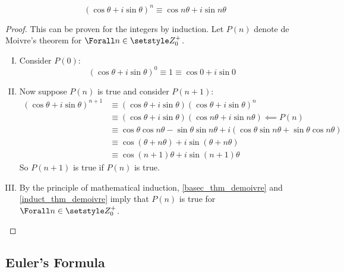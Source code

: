 \begin{theorem}
 \begin{equation*}
  (\cos \theta + i \sin \theta)^n \equiv \cos n\theta + i \sin n\theta
 \end{equation*}
\end{theorem}
\begin{proof}
 This can be proven for the integers by induction. Let \(P(n)\) denote de
 Moivre's theorem for \(\Forall n \in \Integers_0^+\).
 \begin{enumerate}[I.]
  \item \label{basec_thm_demoivre} Consider \(P(0)\):
        \begin{equation*}
         (\cos \theta + i \sin \theta)^0 \equiv 1 \equiv \cos 0 + i \sin 0
        \end{equation*}
  \item \label{induct_thm_demoivre} Now suppose \(P(n)\) is true and consider
        \(P(n + 1)\):
        \begin{align*}
         (\cos \theta + i \sin \theta)^{n + 1} &\equiv
          (\cos \theta + i \sin \theta)(\cos \theta + i \sin \theta)^n \\
          &\equiv (\cos \theta + i \sin \theta)
                  (\cos n\theta + i \sin n\theta) \impliedby P(n) \\
          &\equiv \cos \theta \cos n\theta - \sin \theta \sin n\theta
                + i(\cos \theta \sin n\theta + \sin \theta \cos n\theta) \\
          &\equiv \cos(\theta + n\theta) + i \sin(\theta + n\theta) \\
          &\equiv \cos (n + 1)\theta + i \sin (n + 1)\theta
        \end{align*}
        So \(P(n + 1)\) is true if \(P(n)\) is true.
  \item By the principle of mathematical induction, \ref{basec_thm_demoivre} and
        \ref{induct_thm_demoivre} imply that \(P(n)\) is true for
        \(\Forall n \in \Integers_0^+\).
 \end{enumerate}
\end{proof}

\subsection{Euler's Formula}

